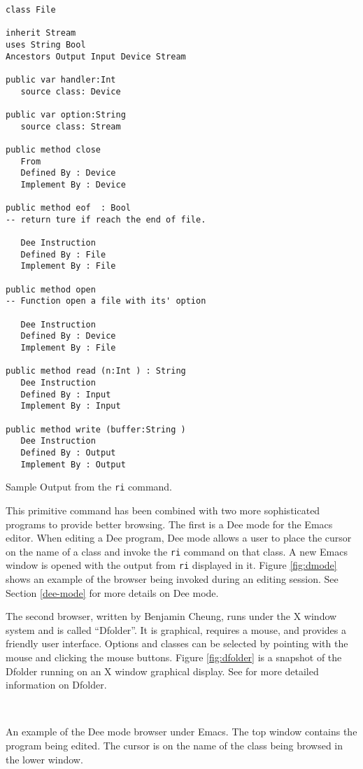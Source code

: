 \begin{shortfigure}
\begin{verbatim}
class File

inherit Stream  
uses String Bool  
Ancestors Output Input Device Stream  

public var handler:Int 
   source class: Device

public var option:String 
   source class: Stream

public method close 
   From
   Defined By : Device
   Implement By : Device

public method eof  : Bool 
-- return ture if reach the end of file.
 
   Dee Instruction
   Defined By : File
   Implement By : File

public method open 
-- Function open a file with its' option
 
   Dee Instruction
   Defined By : Device
   Implement By : File

public method read (n:Int ) : String 
   Dee Instruction
   Defined By : Input
   Implement By : Input

public method write (buffer:String )
   Dee Instruction
   Defined By : Output
   Implement By : Output
\end{verbatim}
\caption{Sample Output from the {\tt ri} command.}
\label{fig:ri}
\end{shortfigure}

This primitive command has been combined with two more sophisticated
programs to provide better browsing.  The first is a Dee mode for the
Emacs editor. When editing a Dee program, Dee mode allows a user to
place the cursor on the name of a class and invoke the {\tt ri}
command on that class.  A new Emacs window is opened with the output
from {\tt ri} displayed in it.  Figure \ref{fig:dmode} shows an
example of the browser being invoked during an editing session.  See
Section \ref{dee-mode} for more details on Dee mode.

The second browser, written by Benjamin Cheung, runs under the X
window system and is called ``Dfolder''.  It is graphical, requires a
mouse, and provides a friendly user interface.  Options and classes
can be selected by pointing with the mouse and clicking the mouse
buttons.  Figure
\ref{fig:dfolder} is a snapshot of the Dfolder running on an X window
graphical display.  See \cite{Bcheung92} for more detailed information
on Dfolder.

\begin{shortfigure}
\centerline{\hbox{
}}
\caption{An example of the Dee mode browser under Emacs.  The top 
window contains the program being edited.  The cursor is on the name
of the class being browsed in the lower window.}
\label{fig:dmode}
\end{shortfigure}

